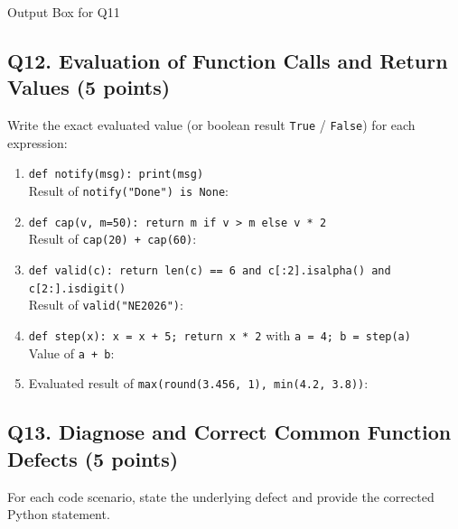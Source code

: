 \documentclass[11pt,a4paper]{article}
\begin{document}
\begin{answerbox}[height=2.8cm]{Output Box for Q11}
\end{answerbox}

\newpage


\subsection*{Q12. Evaluation of Function Calls and Return Values (5 points)}
Write the exact evaluated value (or boolean result \texttt{True} / \texttt{False}) for each expression:

\begin{enumerate}[label=\alph*),leftmargin=2em,itemsep=1pt]
  \item \texttt{def notify(msg): print(msg)}\\
  Result of \texttt{notify("Done") is None}: \hrulefill
  \item \texttt{def cap(v, m=50): return m if v > m else v * 2}\\
  Result of \texttt{cap(20) + cap(60)}: \hrulefill
  \item \texttt{def valid(c): return len(c) == 6 and c[:2].isalpha() and c[2:].isdigit()}\\
  Result of \texttt{valid("NE2026")}: \hrulefill
  \item \texttt{def step(x): x = x + 5; return x * 2} with \texttt{a = 4; b = step(a)}\\
  Value of \texttt{a + b}: \hrulefill
  \item Evaluated result of \texttt{max(round(3.456, 1), min(4.2, 3.8))}: \hrulefill
\end{enumerate}

\subsection*{Q13. Diagnose and Correct Common Function Defects (5 points)}
For each code scenario, state the underlying defect and provide the corrected Python statement.
\end{document}
